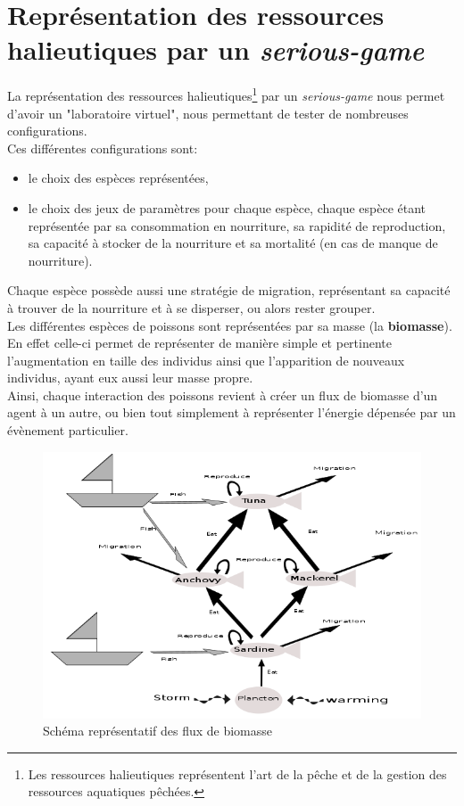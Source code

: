 \section{Représentation des ressources halieutiques par un \textit{serious-game}}

La représentation des ressources halieutiques\footnote{Les ressources halieutiques représentent l'art de la pêche et de la gestion des ressources aquatiques pêchées.} par un \textit{serious-game} nous permet d'avoir un "laboratoire virtuel", nous permettant de tester de nombreuses configurations. 
\\
Ces différentes configurations sont:
\begin{itemize}
\item{le choix des espèces représentées,}
\item{le choix des jeux de paramètres pour chaque espèce, chaque espèce étant représentée par sa consommation en nourriture, sa rapidité de reproduction, sa capacité à stocker de la nourriture et sa mortalité (en cas de manque de nourriture).}
\end{itemize}
Chaque espèce possède aussi une stratégie de migration, représentant sa capacité à trouver de la nourriture et à se disperser, ou alors rester grouper.
\\
Les différentes espèces de poissons sont représentées par sa masse (la \textbf{biomasse}). En effet celle-ci permet de représenter de manière simple et pertinente l'augmentation en taille des individus ainsi que l'apparition de nouveaux individus, ayant eux aussi leur masse propre.
\\
Ainsi, chaque interaction des poissons revient à créer un flux de biomasse d'un agent à un autre, ou bien tout simplement à représenter l'énergie dépensée par un évènement particulier.

\begin{figure}[h]
\begin{center}
\includegraphics[scale=0.65]{img/flux.png}
\end{center}
\caption{Schéma représentatif des flux de biomasse}
\end{figure}

